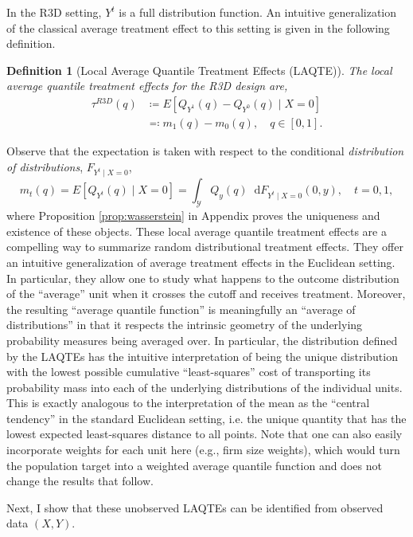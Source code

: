 \documentclass[12pt]{article}
\newcommand*\dd{\mathop{}\!\mathrm{d}}
\newtheorem{definition}{Definition}
\begin{document}
In the R3D setting, $Y^t$ is a full distribution function. An intuitive generalization of the classical average treatment effect to this setting is given in the following definition.
\begin{definition}[Local Average Quantile Treatment Effects (LAQTE)] \label{def:aqte}
The local average quantile treatment effects for the R3D design are,
\begin{equation} \label{eq:treatment_effects_quantile}
\begin{aligned}
\tau^{R3D}(q) & \coloneqq E\left[Q_{Y^1}(q)-Q_{Y^0}(q) \mid X=0\right] \\ 
& \eqqcolon m_1(q) - m_0(q), \quad q \in [0,1].
\end{aligned}
\end{equation}
\end{definition}
Observe that the expectation is taken with respect to the conditional \textit{distribution of distributions}, $F_{Y^t\mid X=0}$,
\[
m_{t}(q) = E[Q_{Y^t}(q) \mid X=0] = \int_{\mathcal{Y}} Q_{y}(q) \dd F_{Y^t \mid X=0}(0,y), \quad t=0,1,
\]
where Proposition \ref{prop:wasserstein} in Appendix proves the uniqueness and existence of these objects. These local average quantile treatment effects are a compelling way to summarize random distributional treatment effects. They offer an intuitive generalization of average treatment effects in the Euclidean setting. In particular, they allow one to study what happens to the outcome distribution of the ``average'' unit when it crosses the cutoff and receives treatment. Moreover, the resulting ``average quantile function'' is meaningfully an ``average of distributions'' in that it respects the intrinsic geometry of the underlying probability measures being averaged over. In particular, the distribution defined by the LAQTEs has the intuitive interpretation of being the unique distribution with the lowest possible cumulative ``least-squares'' cost of transporting its probability mass into each of the underlying distributions of the individual units. This is exactly analogous to the interpretation of the mean as the ``central tendency'' in the standard Euclidean setting, i.e. the unique quantity that has the lowest expected least-squares distance to all points. Note that one can also easily incorporate weights for each unit here (e.g., firm size weights), which would turn the population target into a weighted average quantile function and does not change the results that follow. 

Next, I show that these unobserved LAQTEs can be identified from observed data $(X,Y)$. 
\end{document}
